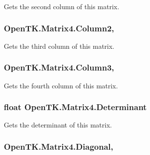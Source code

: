 Gets the second column of this matrix. 

\hypertarget{struct_open_t_k_1_1_matrix4_a8ceb934eacdadb27bc25e1dad87aa19d}{
\subsubsection[{Column2}]{ Open\-T\-K.\-Matrix4.\-Column2\hspace{0.3cm}{\ttfamily [get]}, {\ttfamily [set]}}}\label{struct_open_t_k_1_1_matrix4_a8ceb934eacdadb27bc25e1dad87aa19d}


Gets the third column of this matrix. 

\hypertarget{struct_open_t_k_1_1_matrix4_af8797da77258a8d900f2bfa09f216136}{
\subsubsection[{Column3}]{ Open\-T\-K.\-Matrix4.\-Column3\hspace{0.3cm}{\ttfamily [get]}, {\ttfamily [set]}}}\label{struct_open_t_k_1_1_matrix4_af8797da77258a8d900f2bfa09f216136}


Gets the fourth column of this matrix. 

\hypertarget{struct_open_t_k_1_1_matrix4_a2763231a75e342ff722346ac609ac5f7}{
\subsubsection[{Determinant}]{\setlength{\rightskip}{0pt plus 5cm}float Open\-T\-K.\-Matrix4.\-Determinant\hspace{0.3cm}{\ttfamily [get]}}}\label{struct_open_t_k_1_1_matrix4_a2763231a75e342ff722346ac609ac5f7}


Gets the determinant of this matrix. 

\hypertarget{struct_open_t_k_1_1_matrix4_ae8e762c4a2c8536e12e67380abf3083a}{
\subsubsection[{Diagonal}]{ Open\-T\-K.\-Matrix4.\-Diagonal\hspace{0.3cm}{\ttfamily [get]}, {\ttfamily [set]}}}\label{struct_open_t_k_1_1_matrix4_ae8e762c4a2c8536e12e67380abf3083a}


